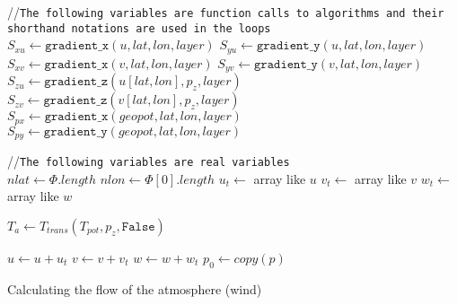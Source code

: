 \begin{algorithm}
    //\texttt{The following variables are function calls to algorithms and their shorthand notations are used in the loops}\\
    $S_{xu} \leftarrow \texttt{gradient\_x}(u, lat, lon, layer)$ \;
    $S_{yu} \leftarrow \texttt{gradient\_y}(u, lat, lon, layer)$ \;
    $S_{xv} \leftarrow \texttt{gradient\_x}(v, lat, lon, layer)$ \;
    $S_{yv} \leftarrow \texttt{gradient\_y}(v, lat, lon, layer)$ \;
    $S_{zu} \leftarrow \texttt{gradient\_z}(u[lat, lon], p_z, layer)$ \;
    $S_{zv} \leftarrow \texttt{gradient\_z}(v[lat, lon], p_z, layer)$ \;
    $S_{px} \leftarrow \texttt{gradient\_x}(geopot, lat, lon, layer)$ \;
    $S_{py} \leftarrow \texttt{gradient\_y}(geopot, lat, lon, layer)$ \;

    //\texttt{The following variables are real variables}\\
    $nlat \leftarrow \Phi.length$ \;
    $nlon \leftarrow \Phi[0].length$ \;
    $u_t \leftarrow $ array like $u$ \;
    $v_t \leftarrow $ array like $v$ \;
    $w_t \leftarrow $ array like $w$ \;

    $T_a \leftarrow T_{trans}(T_{pot}, p_z, \texttt{False})$ \;


    $u \leftarrow u + u_t$ \;
    $v \leftarrow v + v_t$ \;
    $w \leftarrow w + w_t$ \;
    $p_0 \leftarrow copy(p)$ \;
    \caption{Calculating the flow of the atmosphere (wind)}
    \label{alg:velocity}
\end{algorithm}